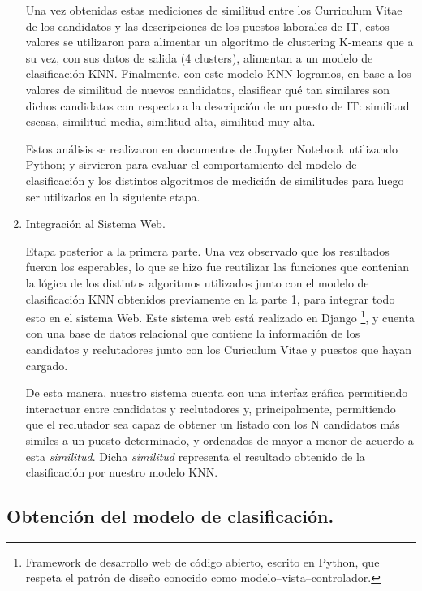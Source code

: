 \documentclass[12pt,a4paper]{article}
\begin{document}
\begin{sloppypar}
\begin{enumerate}
Una vez obtenidas estas mediciones de similitud entre los Curriculum Vitae de los candidatos y las descripciones de los puestos laborales de IT, estos valores se utilizaron para alimentar un algoritmo de clustering K-means que a su vez, con sus datos de salida (4 clusters), alimentan a un modelo de clasificación KNN. Finalmente, con este modelo KNN logramos, en base a los valores de similitud de nuevos candidatos, clasificar qué tan similares son dichos candidatos con respecto a la descripción de un puesto de IT: similitud escasa, similitud media, similitud alta, similitud muy alta.

Estos análisis se realizaron en documentos de Jupyter Notebook utilizando Python; y sirvieron para evaluar el comportamiento del modelo de clasificación y los distintos algoritmos de medición de similitudes para luego ser utilizados en la siguiente etapa. \\

\item Integración al Sistema Web. 

Etapa posterior a la primera parte. Una vez observado que los resultados fueron los esperables, lo que se hizo fue reutilizar las funciones que contenian la lógica de los distintos algoritmos utilizados junto con el modelo de clasificación KNN obtenidos previamente en la parte 1, para integrar todo esto en el sistema Web. Este sistema web está realizado en Django \footnote{Framework de desarrollo web de código abierto, escrito en Python, que respeta el patrón de diseño conocido como modelo–vista–controlador.}, y cuenta con una base de datos relacional que contiene la información de los candidatos y reclutadores junto con los Curiculum Vitae y puestos que hayan cargado. 

De esta manera, nuestro sistema cuenta con una interfaz gráfica permitiendo interactuar entre candidatos y reclutadores y, principalmente, permitiendo que el reclutador sea capaz de obtener un listado con los N candidatos más similes a un puesto determinado, y ordenados de mayor a menor de acuerdo a esta \textit{similitud}. Dicha \textit{similitud} representa el resultado obtenido de la clasificación por nuestro modelo KNN.

\end{enumerate}

\cleardoublepage

\subsection{Obtención del modelo de clasificación.}\label{5.1.Obtenciondelmodelopredictivo}


\end{sloppypar}
\end{document}
